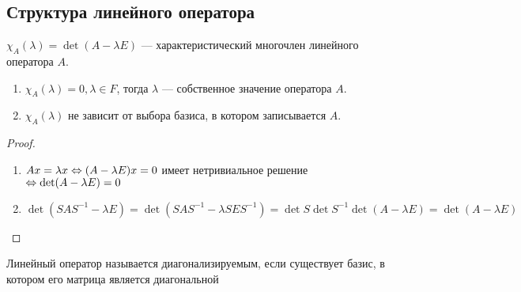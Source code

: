 
\subsection{Структура линейного оператора}
\begin{definition}
    \(\chi_A(\lambda) = \det(A - \lambda E)\) --- характеристический многочлен линейного оператора \(A\).
\end{definition}

\begin{proposition}\indent
    \begin{enumerate}
        \item \(\chi_A(\lambda) = 0, \lambda \in F\), тогда \(\lambda\) --- собственное значение оператора \(A\).
        \item \(\chi_A(\lambda)\) не зависит от выбора базиса, в котором записывается \(A\).
    \end{enumerate}
\end{proposition}
\begin{proof}\indent
    \begin{enumerate}
        \item \(Ax = \lambda x \Leftrightarrow (A - \lambda E)x = 0\) имеет нетривиальное решение \(\Leftrightarrow \det(A - \lambda E) = 0\)
        \item
        \(\det(SAS^{-1} - \lambda E) = \det(SAS^{-1} - \lambda SES^{-1}) = \det S \det S^{-1} \det (A - \lambda E) = \det(A - \lambda E)\)
    \end{enumerate}
\end{proof}

\begin{definition}
    Линейный оператор называется диагонализируемым, если существует базис, в котором его матрица является диагональной
\end{definition}

